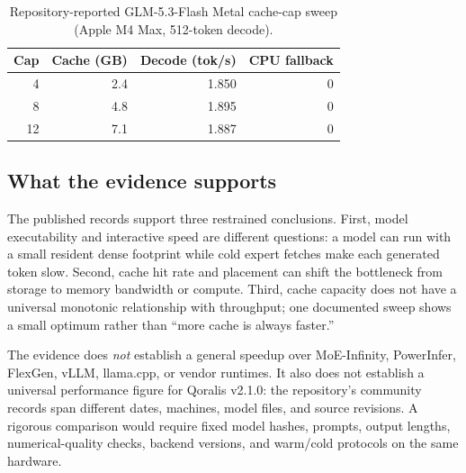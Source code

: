 \documentclass[10pt,twocolumn]{article}
\begin{document}
\begin{table}[t]
\centering
\caption{Repository-reported GLM-5.3-Flash Metal cache-cap sweep (Apple M4 Max, 512-token decode).}
\label{tab:cachecap}
\scriptsize
\setlength{\tabcolsep}{3pt}
\begin{tabular}{@{}rrrr@{}}
\toprule
\textbf{Cap} & \textbf{Cache (GB)} & \textbf{Decode (tok/s)} & \textbf{CPU fallback}\\
\midrule
4 & 2.4 & 1.850 & 0\\
8 & 4.8 & 1.895 & 0\\
12 & 7.1 & 1.887 & 0\\
\bottomrule
\end{tabular}
\end{table}

\subsection{What the evidence supports}
The published records support three restrained conclusions. First, model executability and interactive speed are different questions: a model can run with a small resident dense footprint while cold expert fetches make each generated token slow. Second, cache hit rate and placement can shift the bottleneck from storage to memory bandwidth or compute. Third, cache capacity does not have a universal monotonic relationship with throughput; one documented sweep shows a small optimum rather than ``more cache is always faster.''

The evidence does \emph{not} establish a general speedup over MoE-Infinity, PowerInfer, FlexGen, vLLM, llama.cpp, or vendor runtimes. It also does not establish a universal performance figure for Qoralis v2.1.0: the repository's community records span different dates, machines, model files, and source revisions. A rigorous comparison would require fixed model hashes, prompts, output lengths, numerical-quality checks, backend versions, and warm/cold protocols on the same hardware.
\end{document}
